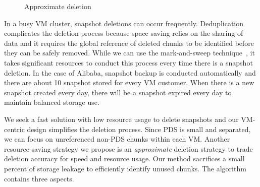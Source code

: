 \begin{figure}[htbp]
  \centering
  \caption{Approximate deletion}
  \label{fig:deletion_flow}
\end{figure}

In a busy VM cluster, snapshot deletions can occur frequently.
Deduplication complicates the deletion process because space saving relies on the sharing of data
and it requires the global reference of deleted chunks to be identified before  they can be safely removed.
While we can use the mark-and-sweep technique~\cite{Guo2011}, 
it takes significant resources to conduct this process every time there is a snapshot deletion.
In the case of Alibaba, snapshot backup is conducted automatically and there are 
about 10 snapshot stored for every VM customer. When there is
a new snapshot created every day,  there will be a snapshot expired every day to maintain
balanced storage use. 

We seek a fast solution with low resource usage to delete snapshots and
our VM-centric design simplifies the deletion process. 
Since PDS is small and separated, we can focus on  unreferenced non-PDS chunks within each VM. 
Another resource-saving strategy we propose is
an {\em approximate} deletion strategy to trade deletion accuracy for
speed and resource usage. Our method sacrifices a small percent of storage leakage
to efficiently identify unused chunks.
The algorithm contains three aspects.

